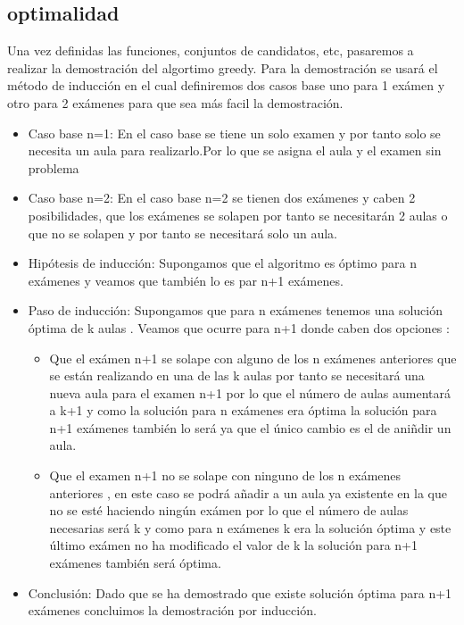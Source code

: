 \documentclass[11pt,openany]{book}
\begin{document}
\subsection{optimalidad}
Una vez definidas las funciones, conjuntos de candidatos, etc,  pasaremos a realizar la demostración del algortimo greedy.
Para la demostración se usará el método de inducción en el cual definiremos dos casos base uno para 1 exámen y otro para 2 
exámenes para que sea más facil la  demostración.

\begin{itemize}
      \item Caso base n=1:
            En el caso base se tiene un solo examen y por tanto solo se necesita un aula para realizarlo.Por lo que se 
            asigna el aula y el examen sin problema
      \item Caso base n=2:
            En el caso base n=2 se tienen dos exámenes y caben 2 posibilidades, que los exámenes se solapen por tanto 
            se necesitarán 2 aulas o que no se solapen y por tanto se necesitará solo un aula.

      \item Hipótesis de inducción:
            Supongamos que el algoritmo es óptimo para n exámenes y veamos que también lo es par n+1 exámenes.
      \item Paso de inducción:
            Supongamos que para n exámenes tenemos una solución óptima de k aulas . Veamos que ocurre para n+1 
            donde caben dos opciones :
            \begin{itemize}
                  \item Que el exámen n+1 se solape con alguno de los n exámenes anteriores  que se están realizando en una 
                        de las k aulas por tanto se necesitará una nueva aula para el examen n+1 por lo que el número de aulas aumentará a 
                        k+1 y como la solución para n exámenes era óptima la solución para n+1 exámenes también lo será ya que el único cambio
                        es el de aniñdir un aula. 
                  \item Que el examen n+1 no se solape con ninguno de los n exámenes anteriores , en este caso se podrá 
                        añadir a un aula ya existente en la que no se esté haciendo ningún exámen 
                        por lo que el número de aulas necesarias será k y como para n exámenes k era la solución óptima y este último 
                        exámen no ha modificado el valor de k la solución para n+1 exámenes también será óptima.
            \end{itemize}
      \item Conclusión:
            Dado que se ha demostrado que existe solución óptima para n+1 exámenes concluimos 
            la demostración por inducción.

\end{itemize}
\end{document}
